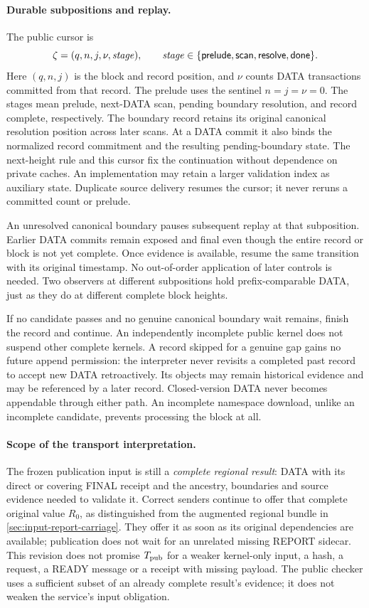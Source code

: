 \paragraph{Durable subpositions and replay.}
\label{sec:subpositions}
The public cursor is
\[
 \zeta=(q,n,j,\nu,\mathit{stage}),\qquad
 \mathit{stage}\in\{\mathsf{prelude},\mathsf{scan},\mathsf{resolve},\mathsf{done}\}.
\]
Here $(q,n,j)$ is the block and record position, and $\nu$ counts DATA
transactions committed from that record. The prelude uses the sentinel
$n=j=\nu=0$. The stages mean prelude, next-DATA scan, pending boundary
resolution, and record complete, respectively. The boundary record
retains its original canonical resolution position across later scans.
At a DATA commit it also binds the normalized record commitment and
the resulting pending-boundary state. The next-height rule and this
cursor fix the continuation without dependence on private caches.
An implementation may retain a larger validation index as auxiliary
state. Duplicate source delivery resumes the cursor; it never reruns
a committed count or prelude.

An unresolved canonical boundary pauses subsequent replay at that
subposition. Earlier DATA commits remain exposed and final even though
the entire record or block is not yet complete. Once evidence is
available, resume the same transition with its original timestamp.
No out-of-order application of later controls is needed. Two observers
at different subpositions hold prefix-comparable DATA, just as they do
at different complete block heights.

If no candidate passes and no genuine canonical boundary wait remains,
finish the record and continue. An independently incomplete public kernel
does not suspend other complete kernels. A record skipped for a genuine
gap gains no future append permission: the interpreter never revisits
a completed past record to accept new DATA retroactively. Its objects
may remain historical evidence and may be referenced by a later record.
Closed-version DATA never becomes appendable through either path.
An incomplete namespace download, unlike an incomplete candidate,
prevents processing the block at all.

\paragraph{Scope of the transport interpretation.}
\label{sec:transport-scope}
The frozen publication input is still a \emph{complete regional result}:
DATA with its direct or covering FINAL receipt and the ancestry,
boundaries and source evidence needed to validate it. Correct senders
continue to offer that complete original value $R_0$, as distinguished
from the augmented regional bundle in \cref{sec:input-report-carriage}.
They offer it as soon as its original dependencies are available;
publication does not wait for an unrelated missing REPORT sidecar.
This revision does not promise
$T_{\rm pub}$ for a weaker kernel-only input, a hash, a request, a READY
message or a receipt with missing payload. The public checker uses a
sufficient subset of an already complete result's evidence; it does not
weaken the service's input obligation.

